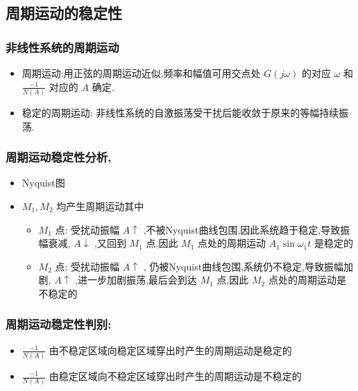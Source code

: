 \documentclass[table]{beamer}
\begin{document}
\subsection{周期运动的稳定性}
\label{sec-2-4}
\begin{frame}
\frametitle{非线性系统的周期运动}
\label{sec-2-4-1}

\begin{itemize}
\item 周期运动:用正弦的周期运动近似,频率和幅值可用交点处  $G(j\omega)$ 的对应  $\omega$  和  $\frac{-1}{N(A)}$  对应的  $A$  确定.
\item <2-> 稳定的周期运动: 非线性系统的自激振荡受干扰后能收敛于原来的等幅持续振荡.
\end{itemize}
\end{frame}
\begin{frame}
\frametitle{周期运动稳定性分析,}
\label{sec-2-4-2}
\begin{itemize}

\item Nyquist图
\label{sec-2-4-2-1}%


\item $M_1,M_2$  均产生周期运动其中
\label{sec-2-4-2-2}%
\begin{itemize}
\item <2->$M_1$  点: 受扰动振幅  $A\uparrow$  ,不被Nyquist曲线包围,因此系统趋于稳定,导致振幅衰减, $A\downarrow$ ,又回到  $M_1$  点,因此  $M_1$  点处的周期运动  $A_1\sin\omega_1 t$  是稳定的
\item <3->$M_2$  点: 受扰动振幅  $A\uparrow$  , 仍被Nyquist曲线包围,系统仍不稳定,导致振幅加剧, $A\uparrow$ ,进一步加剧振荡,最后会到达  $M_1$  点,因此  $M_2$  点处的周期运动是不稳定的
\end{itemize}

\end{itemize} %
\end{frame}
\begin{frame}
\frametitle{周期运动稳定性判别:}
\label{sec-2-4-3}

\begin{itemize}
\item $\frac{-1}{N(A)}$  由不稳定区域向稳定区域穿出时产生的周期运动是稳定的
\item <2->$\frac{-1}{N(A)}$  由稳定区域向不稳定区域穿出时产生的周期运动是不稳定的
\end{itemize}
\end{frame}
\end{document}
